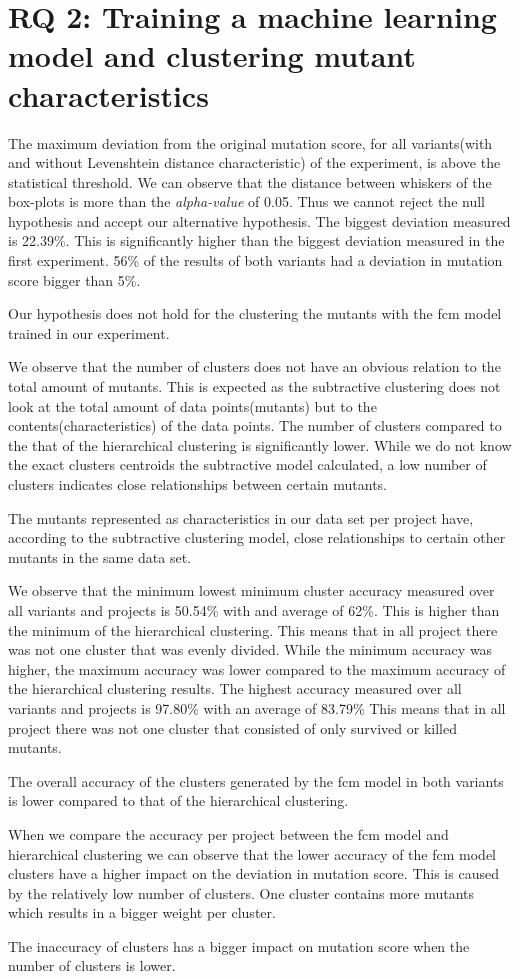 \documentclass[../main]{subfiles}
\begin{document}
\section{RQ 2: Training a machine learning model and clustering mutant characteristics}
The maximum deviation from the original mutation score, for all variants(with and without Levenshtein distance characteristic) of the experiment, is above the statistical threshold.
We can observe that the distance between whiskers of the box-plots is more than the \textit{alpha-value} of 0.05.
Thus we cannot reject the null hypothesis and accept our alternative hypothesis.
The biggest deviation measured is 22.39\%.
This is significantly higher than the biggest deviation measured in the first experiment.
56\% of the results of both variants had a deviation in mutation score bigger than 5\%.
\begin{finding}
Our hypothesis does not hold for the clustering the mutants with the \acrshort{fcm} model trained in our experiment.
\end{finding}
We observe that the number of clusters does not have an obvious relation to the total amount of mutants. 
This is expected as the subtractive clustering does not look at the total amount of data points(mutants) but to the contents(characteristics) of the data points.
The number of clusters compared to the that of the hierarchical clustering is significantly lower.
While we do not know the exact clusters centroids the subtractive model calculated, a low number of clusters indicates close relationships between certain mutants.
\begin{finding}
The mutants represented as characteristics in our data set per project have, according to the subtractive clustering model, close relationships to certain other mutants in the same data set.
\end{finding}
We observe that the minimum lowest minimum cluster accuracy measured over all variants and projects is 50.54\% with and average of 62\%. 
This is higher than the minimum of the hierarchical clustering.
This means that in all project there was not one cluster that was evenly divided.
While the minimum accuracy was higher, the maximum accuracy was lower compared to the maximum accuracy of the hierarchical clustering results.
The highest accuracy measured over all variants and projects is 97.80\% with an average of 83.79\%
This means that in all project there was not one cluster that consisted of only survived or killed mutants.
\begin{finding}
The overall accuracy of the clusters generated by the \acrshort{fcm} model in both variants is lower compared to that of the hierarchical clustering.
\end{finding}
When we compare the accuracy per project between the \acrshort{fcm} model and hierarchical clustering we can observe that the lower accuracy of the \acrshort{fcm} model clusters have a higher impact on the deviation in mutation score.
This is caused by the relatively low number of clusters.
One cluster contains more mutants which results in a bigger weight per cluster.
\begin{finding}
The inaccuracy of clusters has a bigger impact on mutation score when the number of clusters is lower.
\end{finding}
\end{document}
